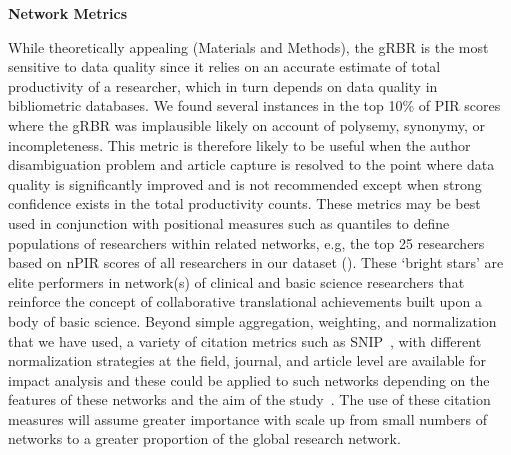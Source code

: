 \documentclass[10pt,letterpaper]{article}
\begin{document}
\textbf{Network Metrics}   

While theoretically appealing (Materials and Methods), the gRBR is the most sensitive to data quality since it relies on an accurate estimate of total productivity of a researcher, which in turn depends on data quality in bibliometric databases. We found several instances in the top 10\% of PIR scores where the gRBR was implausible likely on account of polysemy, synonymy, or incompleteness. This metric is therefore likely to be useful when the author disambiguation problem and article capture is resolved to the point where data quality is significantly improved and is not recommended except when strong confidence exists in the total productivity counts. These metrics may be best used in conjunction with positional measures such as quantiles to define populations of researchers within related networks, e.g, the top 25 researchers based on nPIR scores of all researchers in our dataset ().  These `bright stars' are elite performers in network(s) of clinical and basic science researchers that reinforce the concept of collaborative translational achievements built upon a body of basic science. Beyond simple aggregation, weighting, and normalization that we have used, a variety of citation metrics such as SNIP~\cite{bibWaltman}, with different normalization strategies at the field, journal, and article level are available for impact analysis and these could be applied to such networks depending on the features of these networks and the aim of the study~\cite{bibIoannidis}. The use of these citation measures will assume greater importance with scale up from small numbers of networks to a greater proportion of the global research network.
\end{document}
